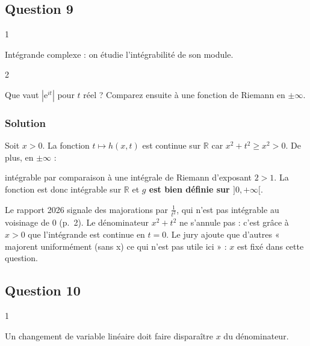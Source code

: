 \documentclass[11pt,a4paper]{article}
\newcommand{\equationajustee}[1]{%
  \sbox{\boiteequation}{$\displaystyle #1$}%
  \ifdim\wd\boiteequation>\linewidth
    \[\resizebox{\linewidth}{!}{\usebox{\boiteequation}}\]%
  \else
    \[#1\]%
  \fi}
\begin{document}
\hypertarget{question-9}{%
\subsection{Question 9}\label{question-9}}

\begin{indication}{1}

Intégrande complexe : on étudie l'intégrabilité de son module.

\end{indication}

\begin{indication}{2}

Que vaut \(|{\mathrm{e}}^{it}|\) pour \(t\) réel ? Comparez ensuite à une fonction de Riemann en \(\pm\infty\).

\end{indication}

\hypertarget{solution-8}{%
\subsubsection{Solution}\label{solution-8}}

Soit \(x>0\). La fonction \(t\mapsto h(x,t)\) est continue sur \(\mathbb{R}\) car \(x^2+t^2\ge x^2>0\). De plus, en \(\pm\infty\) :

\equationajustee{|h(x,t)|=\frac{x}{x^2+t^2}\sim\frac{x}{t^2},}

intégrable par comparaison à une intégrale de Riemann d'exposant \(2>1\). La fonction est donc intégrable sur \(\mathbb{R}\) et \textbf{\(g\) est bien définie sur \(]0,+\infty[\)}.

\begin{piege}

Le rapport 2026 signale des majorations par \(\frac{1}{t^2}\), qui n'est pas intégrable au voisinage de \(0\) (p.~2). Le dénominateur \(x^2+t^2\) ne s'annule pas : c'est grâce à \(x>0\) que l'intégrande est continue en \(t=0\). Le jury ajoute que d'autres « majorent uniformément (sans x) ce qui n'est pas utile ici » : \(x\) est fixé dans cette question.

\end{piege}

\hypertarget{question-10}{%
\subsection{Question 10}\label{question-10}}

\begin{indication}{1}

Un changement de variable linéaire doit faire disparaître \(x\) du dénominateur.

\end{indication}
\end{document}
